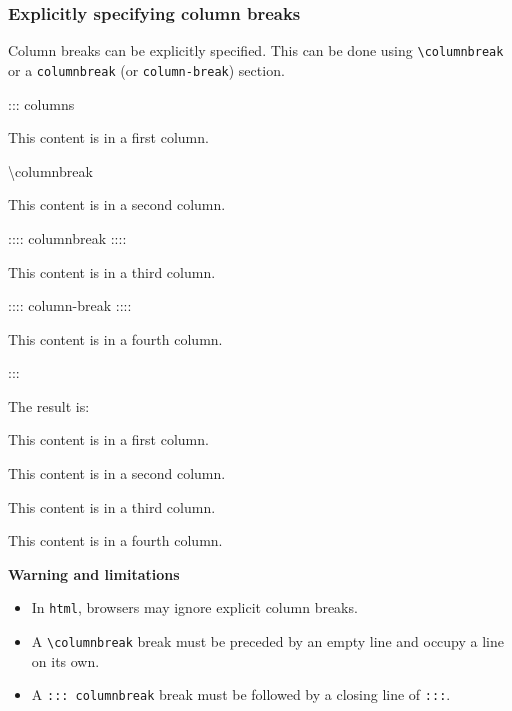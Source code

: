 \documentclass[
]{article}
\newenvironment{Shaded}{}{}
\newcommand{\NormalTok}[1]{#1}
\providecommand{\tightlist}{%
  \setlength{\itemsep}{0pt}\setlength{\parskip}{0pt}}
\begin{document}
\hypertarget{explicitly-specifying-column-breaks}{%
\subsubsection{Explicitly specifying column
breaks}\label{explicitly-specifying-column-breaks}}

Column breaks can be explicitly specified. This can be done using
\texttt{\textbackslash{}columnbreak} or a \texttt{columnbreak} (or
\texttt{column-break}) section.

\begin{Shaded}
\begin{Highlighting}[]
\NormalTok{::: columns}

\NormalTok{This content is in a first column.}

\NormalTok{\textbackslash{}columnbreak}

\NormalTok{This content is in a second column.}

\NormalTok{:::: columnbreak}
\NormalTok{::::}

\NormalTok{This content is in a third column.}

\NormalTok{:::: column{-}break}
\NormalTok{::::}

\NormalTok{This content is in a fourth column.}

\NormalTok{:::}
\end{Highlighting}
\end{Shaded}

The result is:

{\raggedcolumns\begin{multicols}{4}

This content is in a first column.

\columnbreak

This content is in a second column.

\columnbreak

This content is in a third column.

\columnbreak

This content is in a fourth column.

\end{multicols}
}

\textbf{Warning and limitations}

\begin{itemize}
\tightlist
\item
  In \texttt{html}, browsers may ignore explicit column breaks.
\item
  A \texttt{\textbackslash{}columnbreak} break must be preceded by an
  empty line and occupy a line on its own.
\item
  A \texttt{:::\ columnbreak} break must be followed by a closing line
  of \texttt{:::}.
\end{itemize}
\end{document}

